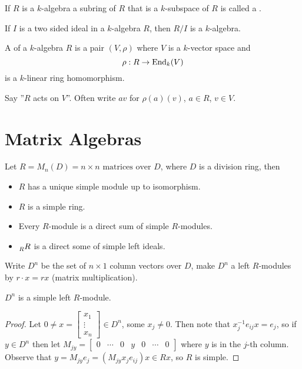   \begin{define}
    If $R$ is a $k$-algebra a subring of $R$ that is a $k$-subspace of $R$ is
    called a .
  \end{define}
  
  If $I$ is a two sided ideal in a $k$-algebra $R$, then $R/I$ is a $k$-algebra.

  \begin{define}
    A  of a $k$-algebra $R$ is a pair $(V,\rho)$ where $V$
    is a $k$-vector space and
    \[ \rho: R \to \operatorname{End}_k(V) \]
    is a $k$-linear ring homomorphism.
  \end{define}
  Say ''$R$ acts on $V$''. Often write $av$ for $\rho(a)(v)$, $a\in R$, $v\in V$.

\section{Matrix Algebras}

  Let $R=M_n(D) = n\times n \text{ matrices over } D$, where $D$ is a division
  ring, then
  \begin{itemize}
    \item $R$ has a unique simple module up to isomorphism.
    \item $R$ is a simple ring.
    \item Every $R$-module is a direct sum of simple $R$-modules.
    \item $\prescript{}{R}{R}$ is a direct some of simple left ideals.
  \end{itemize}

  Write $D^n$ be the set of $n\times 1$ column vectors over $D$, make $D^n$
  a left $R$-modules by $r\cdot x = rx$ (matrix multiplication).
  \begin{prop}
    $D^n$ is a simple left $R$-module.
  \end{prop}
  \begin{proof}
    Let $0\neq x = \begin{bmatrix} x_1 \\ \vdots \\ x_n \end{bmatrix} \in D^n$,
    some $x_j \neq 0$. Then note that $x_j^{-1}e_{ij}x = e_j$, so if $y\in D^n$
    then let $M_{jy} = \begin{bmatrix} 0 & \cdots & 0 & y & 0 & \cdots & 0 \end{bmatrix}$
    where $y$ is in the $j$-th column. Observe that
    $y = M_{jy}e_j = (M_{jy}x_je_{ij})x \in Rx$, so $R$ is simple.
  \end{proof}

